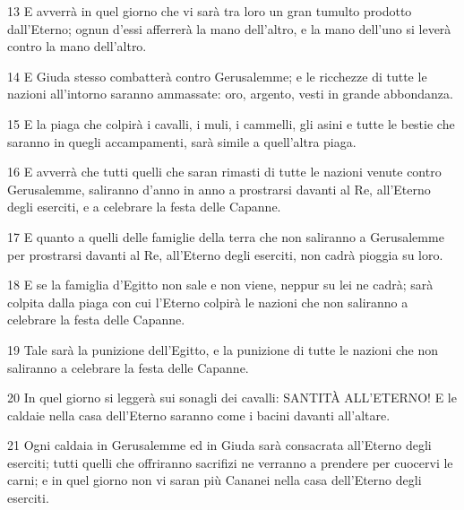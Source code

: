 \par 13 E avverrà in quel giorno che vi sarà tra loro un gran tumulto prodotto dall'Eterno; ognun d'essi afferrerà la mano dell'altro, e la mano dell'uno si leverà contro la mano dell'altro.
\par 14 E Giuda stesso combatterà contro Gerusalemme; e le ricchezze di tutte le nazioni all'intorno saranno ammassate: oro, argento, vesti in grande abbondanza.
\par 15 E la piaga che colpirà i cavalli, i muli, i cammelli, gli asini e tutte le bestie che saranno in quegli accampamenti, sarà simile a quell'altra piaga.
\par 16 E avverrà che tutti quelli che saran rimasti di tutte le nazioni venute contro Gerusalemme, saliranno d'anno in anno a prostrarsi davanti al Re, all'Eterno degli eserciti, e a celebrare la festa delle Capanne.
\par 17 E quanto a quelli delle famiglie della terra che non saliranno a Gerusalemme per prostrarsi davanti al Re, all'Eterno degli eserciti, non cadrà pioggia su loro.
\par 18 E se la famiglia d'Egitto non sale e non viene, neppur su lei ne cadrà; sarà colpita dalla piaga con cui l'Eterno colpirà le nazioni che non saliranno a celebrare la festa delle Capanne.
\par 19 Tale sarà la punizione dell'Egitto, e la punizione di tutte le nazioni che non saliranno a celebrare la festa delle Capanne.
\par 20 In quel giorno si leggerà sui sonagli dei cavalli: SANTITÀ ALL'ETERNO! E le caldaie nella casa dell'Eterno saranno come i bacini davanti all'altare.
\par 21 Ogni caldaia in Gerusalemme ed in Giuda sarà consacrata all'Eterno degli eserciti; tutti quelli che offriranno sacrifizi ne verranno a prendere per cuocervi le carni; e in quel giorno non vi saran più Cananei nella casa dell'Eterno degli eserciti.


